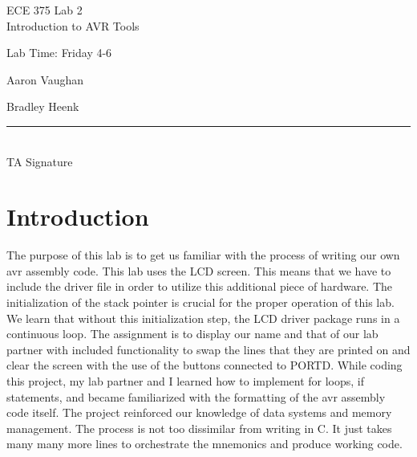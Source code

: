 \documentclass[12pt, letterpaper]{article}
\begin{document}
\begin{titlepage}
    \vspace*{4cm}
    \begin{flushright}
    {\huge
        ECE 375 Lab 2\\[1cm]
    }
    {\large
        Introduction to AVR Tools
    }
    \end{flushright}
    \begin{flushleft}
    Lab Time: Friday 4-6
    \end{flushleft}
    \begin{flushright}
    Aaron Vaughan

    Bradley Heenk
    
    \vfill
    \rule{5in}{.5mm}\\
    TA Signature
    \end{flushright}

\end{titlepage}



\section{Introduction}

The purpose of this lab is to get us familiar with the process of writing our own avr assembly code. This lab uses the LCD screen. This means that we have to include the driver file in order to utilize this additional piece of hardware. The initialization of the stack pointer is crucial for the proper operation of this lab. We learn that without this initialization step, the LCD driver package runs in a continuous loop. 
\newline
The assignment is to display our name and that of our lab partner with included functionality to swap the lines that they are printed on and clear the screen with the use of the buttons connected to PORTD.
\newline
While coding this project, my lab partner and I learned how to implement for loops, if statements, and became familiarized with the formatting of the avr assembly code itself. The project reinforced our knowledge of data systems and memory management. The process is not too dissimilar from writing in C. It just takes many many more lines to orchestrate the mnemonics and produce working code.
        
\end{document}
